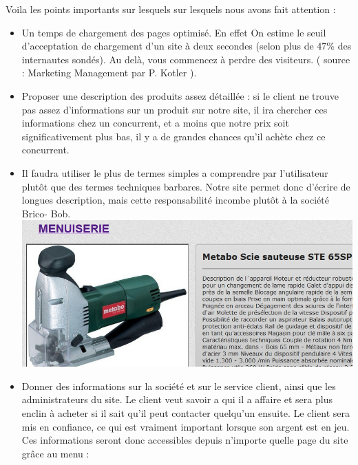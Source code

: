 Voila les points importants sur lesquels sur lesquels nous avons fait attention :
			\begin{itemize}
\item Un temps de chargement des pages optimisé. En effet On estime le seuil d'acceptation de chargement d'un site à deux secondes (selon plus de 47\%  des internautes sondés).  Au delà, vous commencez à perdre des visiteurs. ( source : Marketing Management par  P. Kotler ).\\

\item Proposer une description des produits assez détaillée : si le client ne trouve 	pas 	assez d'informations sur un produit sur notre site, il ira chercher ces 	informations chez un concurrent, et a moins que notre prix soit 	significativement plus bas, il y a de grandes chances qu'il achète chez ce 	concurrent.\\

	
\item Il faudra utiliser le plus de termes simples a comprendre par l'utilisateur plutôt 	que des termes techniques barbares.  Notre site permet donc d'écrire de 	longues description, mais cette responsabilité incombe plutôt à la société Brico-	Bob.\\

\includegraphics[scale=0.5]{demofichepro.jpg}

\item Donner des informations sur la société et sur le service client, ainsi que les 	administrateurs du site. Le client veut savoir a qui il a affaire et sera plus enclin 	à acheter si il sait qu'il peut contacter quelqu'un ensuite. Le client sera mis en 	confiance, ce qui est vraiment important lorsque son argent est en jeu.\\
	Ces informations seront donc accessibles depuis n'importe quelle page du site 	grâce au menu :\\


\end{itemize}
